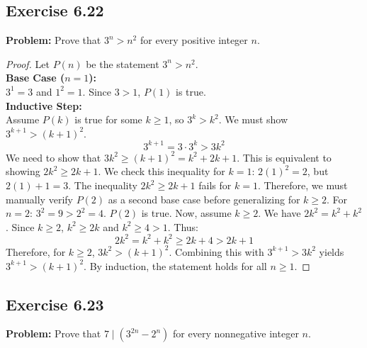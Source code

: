 \documentclass[11pt, a4paper]{article}
\theoremstyle{definition}
\theoremstyle{remark}
\begin{document}
\subsection{Exercise 6.22}
\textbf{Problem:} Prove that $3^n > n^2$ for every positive integer $n$.

\begin{proof}
Let $P(n)$ be the statement $3^n > n^2$.
\vspace{4pt} \\
\textbf{Base Case ($n = 1$):} \\
$3^1 = 3$ and $1^2 = 1$. Since $3 > 1$, $P(1)$ is true.
\vspace{4pt} \\
\textbf{Inductive Step:} \\
Assume $P(k)$ is true for some $k \ge 1$, so $3^k > k^2$. We must show $3^{k+1} > (k+1)^2$.
\[ 3^{k+1} = 3 \cdot 3^k > 3k^2 \]
We need to show that $3k^2 \ge (k+1)^2 = k^2 + 2k + 1$. This is equivalent to showing $2k^2 \ge 2k + 1$.
We check this inequality for $k=1$: $2(1)^2 = 2$, but $2(1)+1 = 3$. The inequality $2k^2 \ge 2k+1$ fails for $k=1$. 
Therefore, we must manually verify $P(2)$ as a second base case before generalizing for $k \ge 2$.
For $n=2$: $3^2 = 9 > 2^2 = 4$. $P(2)$ is true.
Now, assume $k \ge 2$. We have $2k^2 = k^2 + k^2$. Since $k \ge 2$, $k^2 \ge 2k$ and $k^2 \ge 4 > 1$. Thus:
\[ 2k^2 = k^2 + k^2 \ge 2k + 4 > 2k + 1 \]
Therefore, for $k \ge 2$, $3k^2 > (k+1)^2$. Combining this with $3^{k+1} > 3k^2$ yields $3^{k+1} > (k+1)^2$. By induction, the statement holds for all $n \ge 1$.
\end{proof}

\subsection{Exercise 6.23}
\textbf{Problem:} Prove that $7 \mid (3^{2n} - 2^n)$ for every nonnegative integer $n$.
\end{document}
